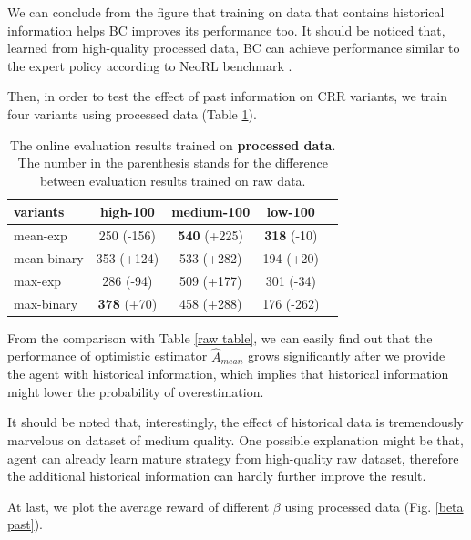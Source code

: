 \documentclass[nohyperref]{article}
\theoremstyle{plain}
\theoremstyle{definition}
\theoremstyle{remark}
\begin{document}
We can conclude from the figure that training on data that contains historical information helps BC improves its performance too. It should be noticed that, learned from high-quality processed data, BC can achieve performance similar to the expert policy according to NeoRL benchmark \cite{2102.00714}.

Then, in order to test the effect of past information on CRR variants, we train four variants using processed data (Table \ref{pro table}). 


\begin{table}[H]
\caption{The online evaluation results trained on \textbf{processed data}. The number in the parenthesis stands for the difference between evaluation results trained on raw data.}
\label{pro table}
\vskip 0.15in
\begin{center}
\begin{small}
\begin{sc}
\begin{tabular}{lcccr}
\toprule
variants & high-100 & medium-100 & low-100 \\
\midrule
mean-exp & 250 (-156) & \textbf{540} (+225) & \textbf{318} (-10)\\
mean-binary & 353 (+124) & 533 (+282) & 194 (+20)\\
max-exp & 286 (-94) & 509 (+177) & 301 (-34)\\
max-binary & \textbf{378} (+70) & 458 (+288) & 176 (-262)\\
\bottomrule
\end{tabular}
\end{sc}
\end{small}
\end{center}
\vskip -0.1in
\end{table}

From the comparison with Table \ref{raw table}, we can easily find out that the performance of optimistic estimator $\hat{A}_{mean}$ grows significantly after we provide the agent with historical information, which implies that historical information might lower the probability of overestimation.


It should be noted that, interestingly, the effect of historical data is tremendously marvelous on dataset of medium quality. One possible explanation might be that, agent can already learn mature strategy from high-quality raw dataset, therefore the additional historical information can hardly further improve the result. 

At last, we plot the average reward of different $\beta$ using processed data (Fig. \ref{beta past}).
\end{document}
